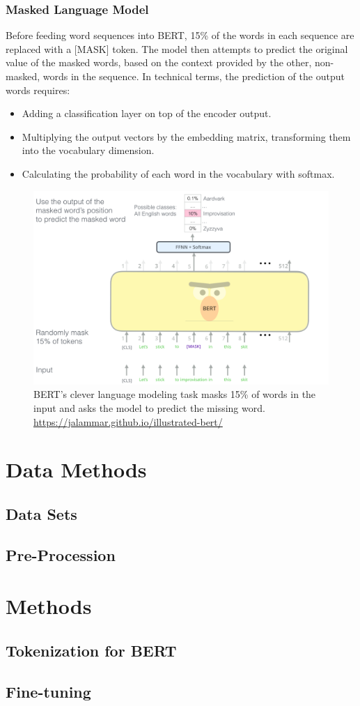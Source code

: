 \subsection{Masked Language Model}
Before feeding word sequences into BERT, 15{\%} of the words in each sequence are replaced with a [MASK] token. The model then attempts to predict the original value of the masked words, based on the context provided by the other, non-masked, words in the sequence. In technical terms, the prediction of the output words requires:
\begin{itemize}

\item Adding a classification layer on top of the encoder output.
\item Multiplying the output vectors by the embedding matrix, transforming them into the vocabulary dimension.
\item Calculating the probability of each word in the vocabulary with softmax.
\end{itemize}

\begin{figure}
\centering
\includegraphics[width=1\textwidth]{BERT-language-modeling-masked-lm.png}
\caption{BERT's clever language modeling task masks 15{\%} of words in the input and asks the model to predict the missing word. \url{https://jalammar.github.io/illustrated-bert/}}
\label{figure 1}
\end{figure}

\chapter{Data Methods}
\section{Data Sets}
\section{Pre-Procession}

\chapter{Methods}
\section{Tokenization for BERT}
\section{Fine-tuning}
